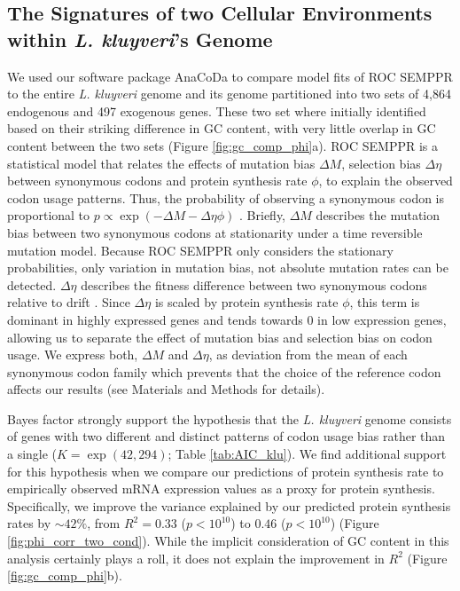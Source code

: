\documentclass[doublespacing,linenumbers]{bmcart-modified}
\newcommand{\kluyveri}{\textit{L. kluyveri}\xspace}
\newcommand{\ROC}{ROC SEMPPR\xspace}
\newcommand{\GC}{GC content\xspace}
\newcommand{\DM}{\ensuremath{{\Delta M}}\xspace}
\newcommand{\DE}{\ensuremath{{\Delta \eta}}\xspace}
\begin{document}
\subsection*{The Signatures of two Cellular Environments within \kluyveri's Genome}
We used our software package AnaCoDa \citep{landerer2018} to compare model fits of \ROC to the entire \kluyveri genome and its genome partitioned into two sets of 4,864 endogenous and 497 exogenous genes.
These two set where initially identified based on their striking difference in \GC \cite{payen2009}, with very little overlap in \GC between the two sets (Figure \ref{fig:gc_comp_phi}a).
\ROC is a statistical model that relates the effects of mutation bias \DM, selection bias \DE between synonymous codons and protein synthesis rate $\phi$, to explain the observed codon usage patterns.
Thus, the probability of observing a synonymous codon is proportional to $p \propto \exp(-\DM-\DE\phi)$ \citep{gilchrist2015}.
Briefly, \DM describes the mutation bias between two synonymous codons at stationarity under a time reversible mutation model.
Because \ROC only considers the stationary probabilities, only variation in mutation bias, not absolute mutation rates can be detected.
\DE describes the fitness difference between two synonymous codons relative to drift \citep{gilchrist2015}. 
Since \DE is scaled by protein synthesis rate $\phi$, this term is dominant in highly expressed genes and tends towards 0 in low expression genes, allowing us to separate the effect of mutation bias and selection bias on codon usage. 
We express both, \DM and \DE, as deviation from the mean of each synonymous codon family which prevents that the choice of the reference codon affects our results (see Materials and Methods for details).

Bayes factor strongly support the hypothesis that the \kluyveri genome consists of genes with two different and distinct patterns of codon usage bias rather than a single ($K = \exp(42,294)$; Table \ref{tab:AIC_klu}).
We find additional support for this hypothesis when we compare our predictions of protein synthesis rate to empirically observed mRNA expression values as a proxy for protein synthesis.
Specifically, we improve the variance explained by our predicted protein synthesis rates by $\sim 42\%$, from $R^2 = 0.33$ ($p < 10^{10}$) to $0.46$ ($p < 10^{10}$) (Figure \ref{fig:phi_corr_two_cond}).
While the implicit consideration of \GC in this analysis certainly plays a roll, it does not explain the improvement in $R^2$ (Figure \ref{fig:gc_comp_phi}b).
\end{document}
